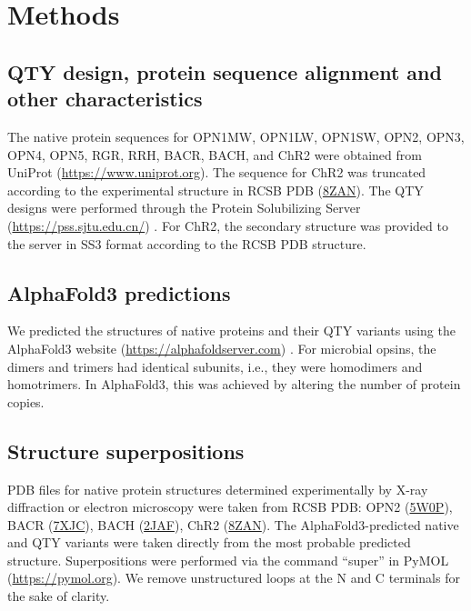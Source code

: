 \documentclass[fleqn,10pt]{manuscript}
\begin{document}
\section*{Methods}

\subsection*{QTY design, protein sequence alignment and other characteristics}

The native protein sequences for OPN1MW, OPN1LW, OPN1SW, OPN2, OPN3, OPN4, OPN5, RGR, RRH, BACR, BACH, and ChR2 were obtained from UniProt (\url{https://www.uniprot.org}). The sequence for ChR2 was truncated according to the experimental structure in RCSB PDB (\href{https://www.rcsb.org/structure/8ZAN}{8ZAN}). The QTY designs were performed through the Protein Solubilizing Server (\url{https://pss.sjtu.edu.cn/}) \citep{Tao_2022}. For ChR2, the secondary structure was provided to the server in SS3 format according to the RCSB PDB structure. 

\subsection*{AlphaFold3 predictions}

We predicted the structures of native proteins and their QTY variants using the AlphaFold3 website (\url{https://alphafoldserver.com}) \citep{Abramson_2024}. For microbial opsins, the dimers and trimers had identical subunits, i.e., they were homodimers and homotrimers. In AlphaFold3, this was achieved by altering the number of protein copies. 

\subsection*{Structure superpositions}

PDB files for native protein structures determined experimentally by X-ray diffraction or electron microscopy were taken from RCSB PDB: OPN2 (\href{https://www.rcsb.org/structure/5W0P}{5W0P}), BACR (\href{https://www.rcsb.org/structure/7XJC}{7XJC}), BACH (\href{https://www.rcsb.org/structure/2JAF}{2JAF}), ChR2 (\href{https://www.rcsb.org/structure/8ZAN}{8ZAN}). The AlphaFold3-predicted native and QTY variants were taken directly from the most probable predicted structure. Superpositions were performed via the command ``super'' in PyMOL (\url{https://pymol.org}). We remove unstructured loops at the N and C terminals for the sake of clarity. 
\end{document}
